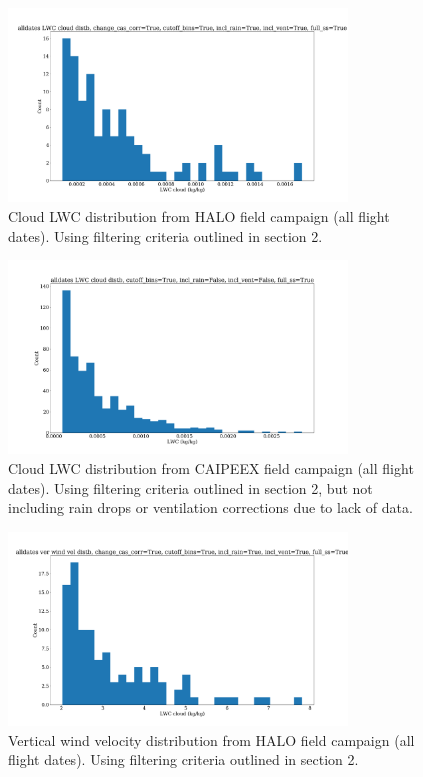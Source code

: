 \documentclass{article}
\begin{document}
\begin{figure}[ht]
    \centering
    \includegraphics[width=9cm]{revhalo/v24_lwc_hist_cas_alldates_figure.png}
    \caption{Cloud LWC distribution from HALO field campaign (all flight dates). Using filtering criteria outlined in section 2.}
    \label{halolwchist}
\end{figure}
\begin{figure}[ht]
    \centering
    \includegraphics[width=9cm]{revcaipeex/v10_lwc_hist_alldates_figure.png}
    \caption{Cloud LWC distribution from CAIPEEX field campaign (all flight dates). Using filtering criteria outlined in section 2, but not including rain drops or ventilation corrections due to lack of data.}
    \label{caipeexlwchist}
\end{figure}
\begin{figure}[ht]
    \centering
    \includegraphics[width=9cm]{revhalo/v24_w_hist_cas_alldates_figure.png}
    \caption{Vertical wind velocity distribution from HALO field campaign (all flight dates). Using filtering criteria outlined in section 2.}
    \label{halowhist}
\end{figure}
\end{document}
